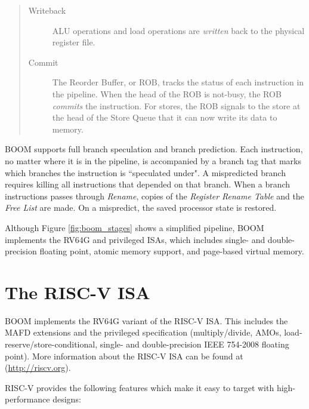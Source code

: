 \begin{quote}
\begin{description}
\item[Writeback]  ALU operations and load operations are {\em written} back to the physical register file.

\item[Commit] The Reorder Buffer, or ROB, tracks the status of each instruction in the pipeline.  When the head of the ROB is not-busy, the ROB {\em commits} the instruction.  For stores, the ROB signals to the store at the head of the Store Queue that it can now write its data to memory.
\end{description}
\end{quote}


  
BOOM supports full branch speculation and branch prediction.  Each instruction, no matter where it is in the pipeline,  is accompanied by a branch tag that marks which branches the instruction is ``speculated under". A mispredicted branch requires killing all instructions that depended on that branch.  When a branch instructions passes through {\em Rename}, copies of the {\em Register Rename Table} and the {\em Free List} are made.  On a mispredict, the saved processor state is restored.

Although Figure \ref{fig:boom_stages} shows a simplified pipeline, BOOM implements the RV64G and privileged ISAs, which includes single- and double-precision floating point, atomic memory support, and page-based virtual memory. 



\section{The RISC-V ISA}

BOOM implements the RV64G variant of the RISC-V ISA. This includes the MAFD
extensions and the privileged specification (multiply/divide, AMOs,
load-reserve/store-conditional, single- and double-precision IEEE
754-2008 floating point). More information about the RISC-V
ISA can be found at (\url{http://riscv.org}).

RISC-V provides the following features which make it easy to target with high-performance designs:

